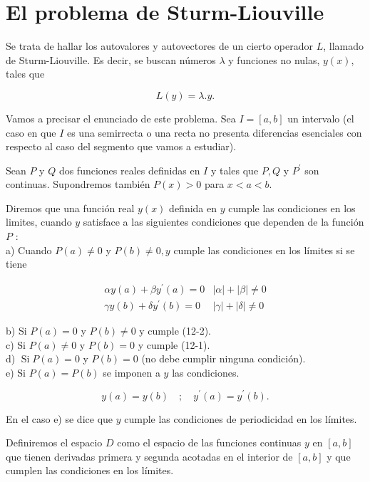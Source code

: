 \documentclass[10pt]{article}
\theoremstyle{plain}
\theoremstyle{definition}
\theoremstyle{remark}
\begin{document}
\section{El problema de Sturm-Liouville}
Se trata de hallar los autovalores y autovectores de un cierto operador $L$, llamado de Sturm-Liouville. Es decir, se buscan números $\lambda$ y funciones no nulas, $y(x)$, tales que

$$
L(y)=\lambda . y .
$$

Vamos a precisar el enunciado de este problema. Sea $I=[a, b]$ un intervalo (el caso en que $I$ es una semirrecta o una recta no presenta diferencias esenciales con respecto al caso del segmento que vamos a estudiar).

Sean $P$ y $Q$ dos funciones reales definidas en $I$ y tales que $P, Q$ y $P^{\prime}$ son continuas. Supondremos también $P(x)>0$ para $x<a<b$.

Diremos que una función real $y(x)$ definida en $y$ cumple las condiciones en los limites, cuando $y$ satisface a las siguientes condiciones que dependen de la función $P$ :\\
a) Cuando $P(a) \neq 0$ y $P(b) \neq 0, y$ cumple las condiciones en los límites si se tiene

\[
\begin{array}{ll}
\alpha y(a)+\beta y^{\prime}(a)=0 & |\alpha|+|\beta| \neq 0 \\
\gamma y(b)+\delta y^{\prime}(b)=0 & |\gamma|+|\delta| \neq 0 \tag{12-2}
\end{array}
\]

b) Si $P(a)=0$ y $P(b) \neq 0$ y cumple (12-2).\\
c) Si $P(a) \neq 0$ y $P(b)=0$ y cumple (12-1).\\
d) $\operatorname{Si} P(a)=0$ y $P(b)=0$ (no debe cumplir ninguna condición).\\
e) Si $P(a)=P(b)$ se imponen a $y$ las condiciones.


\begin{equation*}
y(a)=y(b) \quad ; \quad y^{\prime}(a)=y^{\prime}(b) . \tag{12-3}
\end{equation*}


En el caso e) se dice que $y$ cumple las condiciones de periodicidad en los límites.

Definiremos el espacio $D$ como el espacio de las funciones continuas $y$ en $[a, b]$ que tienen derivadas primera y segunda acotadas en el interior de $[a, b]$ y que cumplen las condiciones en los límites.
\end{document}
